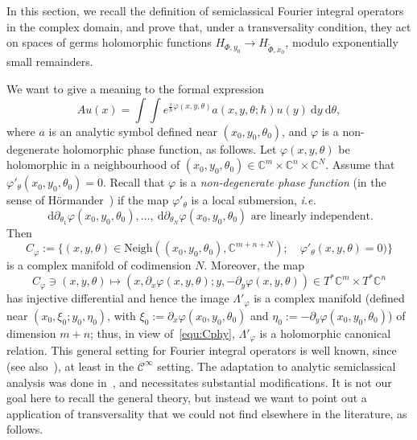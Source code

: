 \documentclass{article}
\newcommand{\Vois}{\mathrm{Neigh}}
\newcommand{\DD}{\:\!\mathrm{d}}
\newcommand{\Cinf}{\mathscr{C}^\infty}
\newcommand{\phy}{\varphi}
\newcommand{\intint}{\int\!\!\!\!\int}
\newcommand{\CM}{\mathbb{C}}
\newcommand{\h}{\hbar}
\begin{document}
In this section, we recall the definition of semiclassical Fourier
integral operators in the complex domain, and prove that, under a
transversality condition, they act on spaces of germs holomorphic
functions $H_{\Phi,y_0}\to H_{\widetilde \Phi, x_0}$, modulo
exponentially small remainders.

We want to give a meaning to the formal expression
\begin{equation}
  \label{equ:formal-fio}
  Au(x) = \intint e^{\frac{i}{\h}\phy(x,y,\theta)}a(x,y,\theta;\h) u(y)
  \DD y \DD \theta,
\end{equation}
where $a$ is an analytic symbol defined near $(x_0,y_0,\theta_0)$, and
$\phy$ is a non-degenerate holomorphic phase function, as follows. Let
$\phy(x,y,\theta)$ be holomorphic in a neighbourhood of
$(x_0,y_0,\theta_0)\in \CM^m\times \CM^n\times \CM^N$. Assume that
$\phy'_\theta(x_0,y_0,\theta_0)=0$. Recall that $\phy$ is a
\emph{non-degenerate phase function} (in the sense of
Hörmander~\cite{FIO1}) if the map $\phy'_\theta$ is a local
submersion, \emph{i.e.}
\begin{equation}
  \label{equ:ND-hormander}
  \DD \partial_{\theta_1}\phy(x_0,y_0,\theta_0),\dots,\DD \partial_{\theta_N}\phy(x_0,y_0,\theta_0)
  \text{  are linearly independent.}
\end{equation}
Then
\[
C_\phy := \{ (x,y,\theta)\in \Vois((x_0,y_0,\theta_0), \CM^{m+n+N});
\quad \phy'_\theta(x,y,\theta)=0)\}
\]
is a complex manifold of codimension $N$. Moreover, the map
\begin{equation}
  C_\phy \ni (x,y,\theta)\mapsto (x,\partial_x\phy(x,y,\theta); y,
  -\partial_y\phy(x,y,\theta)) \in T^*\CM^m \times T^*\CM^n
  \label{equ:Cphy}
\end{equation}
has injective differential and hence the image $\Lambda'_\phy$ is a
complex manifold (defined near $(x_0,\xi_0; y_0,\eta_0)$, with
$\xi_0:=\partial_x\phy(x_0,y_0,\theta_0)$ and
$\eta_0:=-\partial_y\phy(x_0,y_0,\theta_0)$) of dimension $m+n$; thus,
in view of~\eqref{equ:Cphy}, $\Lambda'_\phy$ is a holomorphic
canonical relation. This general setting for Fourier integral
operators is well known, since~\cite{FIO1} (see
also~\cite{duistermaat-oif}), at least in the $\Cinf$ setting. The
adaptation to analytic semiclassical analysis was done
in~\cite{sj-asterisque-82}, and necessitates substantial
modifications. It is not our goal here to recall the general theory,
but instead we want to point out a application of transversality that
we could not find elsewhere in the literature, as follows.
\end{document}
